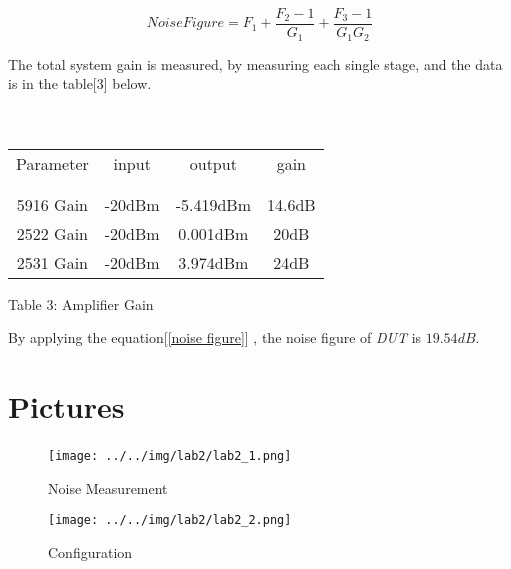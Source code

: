 \documentclass[]{article}
\begin{document}
\begin{equation}
    Noise Figure = F_{1} + \frac{F_{2} - 1}{G_{1}} + \frac{F_{3} - 1}{G_{1}G_{2}}
    \label{cascading amplifiers}
\end{equation}

The total system gain is measured, by measuring each single stage, and the data is 
in the table[3] below. \\ \\ \\

\begin{center}
    \begin{tabular}{c c c c}
        Parameter & input & output & gain\\ \\ \hline \\
        5916 Gain  & -20dBm & -5.419dBm & 14.6dB\\
        2522 Gain  & -20dBm & 0.001dBm & 20dB\\
        2531 Gain  & -20dBm & 3.974dBm & 24dB
    \end{tabular}
\end{center}

\begin{center}
    Table 3: Amplifier Gain
\end{center}

By applying the equation[\ref{noise figure}] , the noise figure of \textit{DUT} is $19.54dB$.

\section{Pictures}

\begin{figure}[p]
    \begin{center}
            \texttt{[image: ../../img/lab2/lab2\_1.png]}~
            \caption{Noise Measurement}
    \end{center}
\end{figure}

\begin{figure}[p]
    \begin{center}
            \texttt{[image: ../../img/lab2/lab2\_2.png]}
            \caption{Configuration}
    \end{center}
\end{figure}
\end{document}
